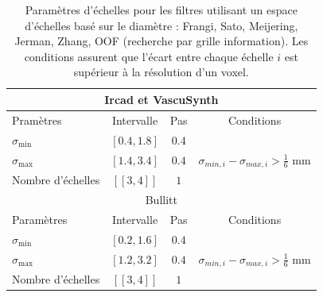 \begin{table}[H]
  \caption{Paramètres d'échelles pour les filtres utilisant un espace d'échelles basé sur le diamètre :  Frangi, Sato, Meijering, Jerman, Zhang, OOF (recherche par grille information). Les conditions  assurent que l'écart entre chaque échelle $i$ est supérieur à la résolution d'un voxel.}
  \label{tab:SS_interval}
  \begin{center}
    \begin{tabular}{  l  c  c  c }
      \hline
      \multicolumn{4}{c}{ Ircad et VascuSynth }\\
      \hline
      Pramètres & Intervalle & Pas & Conditions \\
      \hline
      $\sigma_{\min}$ & $[0.4,1.8]$ & $0.4$ & \\
      $\sigma_{\max}$ & $[1.4,3.4]$  & $0.4$ & $\sigma_{min,i} - \sigma_{max,i} > \frac{1}{6}$ mm \\ 
      Nombre d'échelles & $[\![3,4]\!]$ & $1$ & \\
      \hline
      \hline
      \multicolumn{4}{c}{ Bullitt }\\
      \hline
      Paramètres & Intervalle & Pas & Conditions \\
      \hline
      $\sigma_{\min}$ & $[0.2,1.6]$ & $0.4$ & \\
      $\sigma_{\max}$ & $[1.2,3.2]$  & $0.4$ & $\sigma_{min,i} - \sigma_{max,i} > \frac{1}{6}$ mm \\ 
      Nombre d'échelles & $[\![3,4]\!]$ & $1$ & \\
      \hline
    \end{tabular}
  \end{center}
\end{table}

